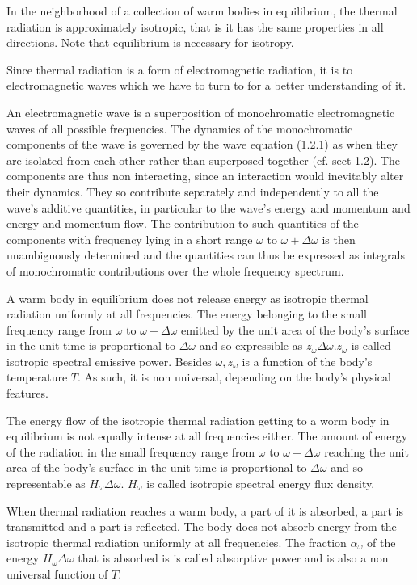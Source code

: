 \documentclass{article}
\begin{document}
In the neighborhood of a collection of warm bodies in equilibrium, the thermal radiation is approximately isotropic, that is it has the same properties in all directions. Note that equilibrium is necessary for isotropy.

Since thermal radiation is a form of electromagnetic radiation, it is to electromagnetic waves which we have to turn to for a better understanding of it.

An electromagnetic wave is a superposition of monochromatic electromagnetic waves of all possible frequencies. The dynamics of the monochromatic components of the wave is governed by the wave equation (1.2.1) as when they are
isolated from each other rather than superposed together (cf. sect 1.2). The components are thus non interacting, since an interaction would inevitably alter their dynamics. They so contribute separately and independently to all the wave's additive quantities, in particular to the wave's energy and momentum and energy and momentum flow. The contribution to such quantities of the components with frequency lying in a short range $\omega$ to $\omega+\Delta \omega$ is then unambiguously determined and the quantities can thus be expressed as integrals of monochromatic contributions over the whole frequency spectrum.

A warm body in equilibrium does not release energy as isotropic thermal radiation uniformly at all frequencies. The energy belonging to the small frequency range from $\omega$ to $\omega+\Delta \omega$ emitted by the unit area of the body's surface in the unit time is proportional to $\Delta \omega$ and so expressible as $z_{\omega} \Delta \omega . z_{\omega}$ is called isotropic spectral emissive power. Besides $\omega, z_{\omega}$ is a function of the body's temperature $T$. As such, it is non universal, depending on the body's physical features.

The energy flow of the isotropic thermal radiation getting to a worm body in equilibrium is not equally intense at all frequencies either. The amount of energy of the radiation in the small frequency range from $\omega$ to $\omega+\Delta \omega$ reaching the unit area of the body's surface in the unit time is proportional to $\Delta \omega$ and so representable as $H_{\omega} \Delta \omega$. $H_{\omega}$ is called isotropic spectral energy flux density.

When thermal radiation reaches a warm body, a part of it is absorbed, a part is transmitted and a part is reflected. The body does not absorb energy from the isotropic thermal radiation uniformly at all frequencies. The fraction $\alpha_{\omega}$ of the energy $H_{\omega} \Delta \omega$ that is absorbed is is called absorptive power and is also a non universal function of $T$.
\end{document}

